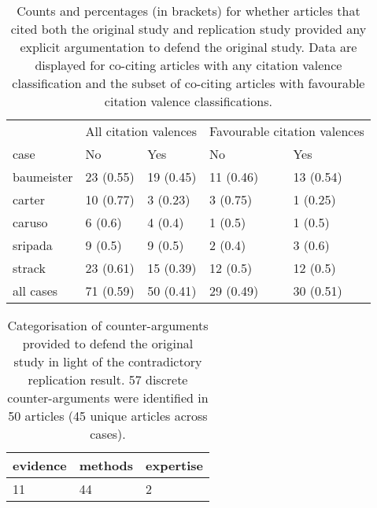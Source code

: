 \documentclass[
  american,
  ,man,floatsintext]{apa6}
\begin{document}
\begin{table}

\caption{\label{tab:caFreq}Counts and percentages (in brackets) for whether articles that cited both the original study and replication study provided any explicit argumentation to defend the original study. Data are displayed for co-citing articles with any citation valence classification and the subset of co-citing articles with favourable citation valence classifications.}
\centering
\begin{tabular}[t]{lllll}
\toprule
\multicolumn{1}{c}{ } & \multicolumn{2}{c}{All citation valences} & \multicolumn{2}{c}{Favourable citation valences} \\
\cmidrule(l{3pt}r{3pt}){2-3} \cmidrule(l{3pt}r{3pt}){4-5}
case & No & Yes & No  & Yes \\
\midrule
baumeister & 23 (0.55) & 19 (0.45) & 11 (0.46) & 13 (0.54)\\
carter & 10 (0.77) & 3 (0.23) & 3 (0.75) & 1 (0.25)\\
caruso & 6 (0.6) & 4 (0.4) & 1 (0.5) & 1 (0.5)\\
sripada & 9 (0.5) & 9 (0.5) & 2 (0.4) & 3 (0.6)\\
strack & 23 (0.61) & 15 (0.39) & 12 (0.5) & 12 (0.5)\\
\addlinespace
all cases & 71 (0.59) & 50 (0.41) & 29 (0.49) & 30 (0.51)\\
\bottomrule
\end{tabular}
\end{table}

\begin{table}[tbp]

\begin{center}
\begin{threeparttable}

\caption{\label{tab:caCategories}Categorisation of counter-arguments provided to defend the original study in light of the contradictory replication result. 57 discrete counter-arguments were identified in 50 articles (45 unique articles across cases).}

\begin{tabular}{lll}
\toprule
evidence & \multicolumn{1}{c}{methods} & \multicolumn{1}{c}{expertise}\\
\midrule
11 & 44 & 2\\
\bottomrule
\end{tabular}

\end{threeparttable}
\end{center}

\end{table}
\end{document}
